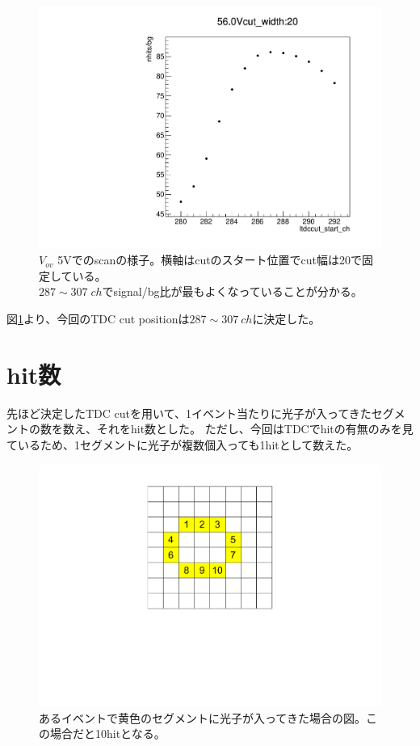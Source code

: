 \documentclass[uplatex, titlepage, dvipdfmx, 12pt, a4paper]{jsreport}
\begin{document}
  \begin{figure}[bp]
    \begin{center} 
      \includegraphics[clip, scale=0.3]{image/TDCcut_scan.pdf}
      \caption{$V_{ov}$ 5\si{V}でのscanの様子。横軸はcutのスタート位置でcut幅は20で固定している。\\ $287\sim 307\;\si{ch}$でsignal/bg比が最もよくなっていることが分かる。}
      \label{fig:tdc_scan} 
    \end{center}
  \end{figure}
  図\ref{fig:tdc_scan}より、今回のTDC cut positionは$287 \sim 307 \:\si{ch}$に決定した。

  \section{hit数}
    先ほど決定したTDC cutを用いて、1イベント当たりに光子が入ってきたセグメントの数を数え、それをhit数とした。
    ただし、今回はTDCでhitの有無のみを見ているため、1セグメントに光子が複数個入っても1hitとして数えた。
    \begin{figure}[h]
      \begin{center} 
        \includegraphics[scale=0.4, clip]{image/hit_image.pdf}
        \caption{あるイベントで黄色のセグメントに光子が入ってきた場合の図。この場合だと10hitとなる。} 
        \label{fig:hit_image} 
      \end{center}
    \end{figure}
    
\end{document}
